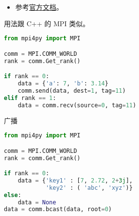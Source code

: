 
\begin{issues}
\issueDraft
\end{issues}

\begin{itemize}
\item 参考\href{https://mpi4py.readthedocs.io/en/stable/}{官方文档}。
\end{itemize}

用法跟 C++ 的 MPI 类似。

\begin{lstlisting}[language=python]
from mpi4py import MPI

comm = MPI.COMM_WORLD
rank = comm.Get_rank()

if rank == 0:
    data = {'a': 7, 'b': 3.14}
    comm.send(data, dest=1, tag=11)
elif rank == 1:
    data = comm.recv(source=0, tag=11)
\end{lstlisting}

广播
\begin{lstlisting}[language=python]
from mpi4py import MPI

comm = MPI.COMM_WORLD
rank = comm.Get_rank()

if rank == 0:
    data = {'key1' : [7, 2.72, 2+3j],
            'key2' : ( 'abc', 'xyz')}
else:
    data = None
data = comm.bcast(data, root=0)
\end{lstlisting}
